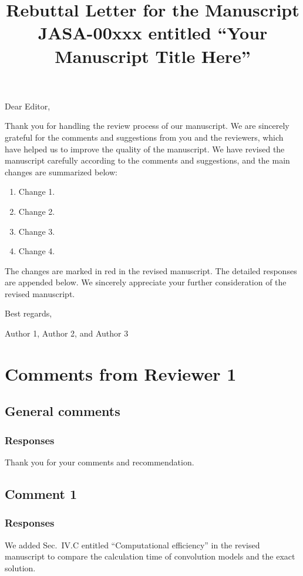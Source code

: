 \documentclass{article}
\title{\textbf{Rebuttal Letter for the Manuscript JASA-00xxx entitled ``Your Manuscript Title Here''}}
\begin{document}
\maketitle

\thispagestyle{firststyle}

\noindent 
Dear Editor,

Thank you for handling the review process of our manuscript. 
We are sincerely grateful for the comments and suggestions from you and the reviewers, which have helped us
to improve the quality of the manuscript. We have revised the manuscript carefully according to
the comments and suggestions, and the main changes are summarized below:
\begin{enumerate}
    \item Change 1.
    \item Change 2.
    \item Change 3.
    \item Change 4.
\end{enumerate}

The changes are marked in red in the revised manuscript. 
The detailed responses are appended below.
We sincerely appreciate your further consideration of the revised manuscript.


\medskip
\noindent
Best regards,

\medskip
\noindent
Author 1, Author 2, and Author 3

\newpage
\section{Comments from Reviewer 1}


\subsection{General comments}
\lipsum[1]

\lipsum[2]


\subsubsection*{Responses}
Thank you for your comments and recommendation.

\subsection{Comment 1}
\lipsum[3]

\subsubsection*{Responses}
We added Sec.~IV.C entitled ``Computational efficiency'' in the revised manuscript to compare the calculation time of convolution models and the exact solution.
\end{document}
